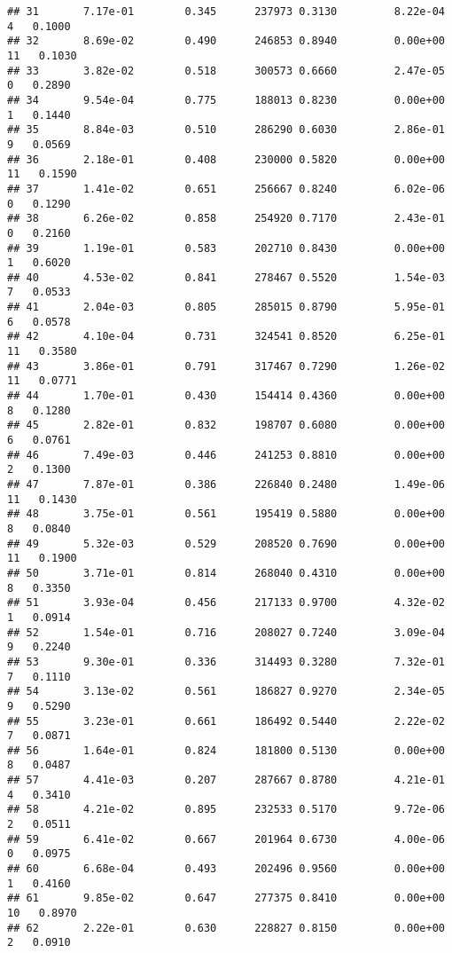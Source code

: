 \documentclass[
]{article}
\begin{document}
\begin{verbatim}
## 31       7.17e-01        0.345      237973 0.3130         8.22e-04   4   0.1000
## 32       8.69e-02        0.490      246853 0.8940         0.00e+00  11   0.1030
## 33       3.82e-02        0.518      300573 0.6660         2.47e-05   0   0.2890
## 34       9.54e-04        0.775      188013 0.8230         0.00e+00   1   0.1440
## 35       8.84e-03        0.510      286290 0.6030         2.86e-01   9   0.0569
## 36       2.18e-01        0.408      230000 0.5820         0.00e+00  11   0.1590
## 37       1.41e-02        0.651      256667 0.8240         6.02e-06   0   0.1290
## 38       6.26e-02        0.858      254920 0.7170         2.43e-01   0   0.2160
## 39       1.19e-01        0.583      202710 0.8430         0.00e+00   1   0.6020
## 40       4.53e-02        0.841      278467 0.5520         1.54e-03   7   0.0533
## 41       2.04e-03        0.805      285015 0.8790         5.95e-01   6   0.0578
## 42       4.10e-04        0.731      324541 0.8520         6.25e-01  11   0.3580
## 43       3.86e-01        0.791      317467 0.7290         1.26e-02  11   0.0771
## 44       1.70e-01        0.430      154414 0.4360         0.00e+00   8   0.1280
## 45       2.82e-01        0.832      198707 0.6080         0.00e+00   6   0.0761
## 46       7.49e-03        0.446      241253 0.8810         0.00e+00   2   0.1300
## 47       7.87e-01        0.386      226840 0.2480         1.49e-06  11   0.1430
## 48       3.75e-01        0.561      195419 0.5880         0.00e+00   8   0.0840
## 49       5.32e-03        0.529      208520 0.7690         0.00e+00  11   0.1900
## 50       3.71e-01        0.814      268040 0.4310         0.00e+00   8   0.3350
## 51       3.93e-04        0.456      217133 0.9700         4.32e-02   1   0.0914
## 52       1.54e-01        0.716      208027 0.7240         3.09e-04   9   0.2240
## 53       9.30e-01        0.336      314493 0.3280         7.32e-01   7   0.1110
## 54       3.13e-02        0.561      186827 0.9270         2.34e-05   9   0.5290
## 55       3.23e-01        0.661      186492 0.5440         2.22e-02   7   0.0871
## 56       1.64e-01        0.824      181800 0.5130         0.00e+00   8   0.0487
## 57       4.41e-03        0.207      287667 0.8780         4.21e-01   4   0.3410
## 58       4.21e-02        0.895      232533 0.5170         9.72e-06   2   0.0511
## 59       6.41e-02        0.667      201964 0.6730         4.00e-06   0   0.0975
## 60       6.68e-04        0.493      202496 0.9560         0.00e+00   1   0.4160
## 61       9.85e-02        0.647      277375 0.8410         0.00e+00  10   0.8970
## 62       2.22e-01        0.630      228827 0.8150         0.00e+00   2   0.0910

\end{verbatim}
\end{document}
